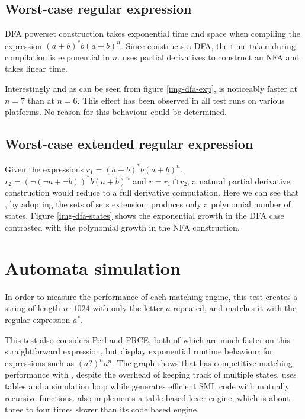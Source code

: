 \subsection{Worst-case regular expression}

DFA powerset construction takes exponential time and space when compiling the
expression $(a+b)^*b(a+b)^n$. Since \mlulex{} constructs a DFA, the time taken
during compilation is exponential in $n$. \dreml{} uses partial derivatives to
construct an NFA and takes linear time.


Interestingly and as can be seen from figure \ref{img-dfa-exp}, \mlulex{} is
noticeably faster at $n = 7$ than at $n = 6$. This effect has been observed in
all test runs on various platforms. No reason for this behaviour could be
determined.


\subsection{Worst-case extended regular expression}

Given the expressions $r_1 = (a+b)^*b(a+b)^n$, $r_2 = (\neg(\neg a + \neg
b))^*b(a+b)^n$ and $r = r_1 \cap r_2$, a natural partial derivative construction
would reduce to a full derivative computation. Here we can see that \dreml{}, by
adopting the sets of sets extension, produces only a polynomial number of
states. Figure \ref{img-dfa-states} shows the exponential growth in the DFA case
contrasted with the polynomial growth in the NFA construction.



\section{Automata simulation}

In order to measure the performance of each matching engine, this test creates a
string of length $n \cdot 1024$ with only the letter $a$ repeated, and matches
it with the regular expression $a^*$.


This test also considers Perl and PRCE, both of which are much faster on this
straightforward expression, but display exponential runtime behaviour for
expressions such as $(a?)^na^n$. The graph shows that \dreml{} has competitive
matching performance with \mlulex{}, despite the overhead of keeping track of
multiple states. \dreml{} uses tables and a simulation loop while \mlulex{}
generates efficient SML code with mutually recursive functions. \mlulex{} also
implements a table based lexer engine, which is about three to four times slower
than its code based engine.

